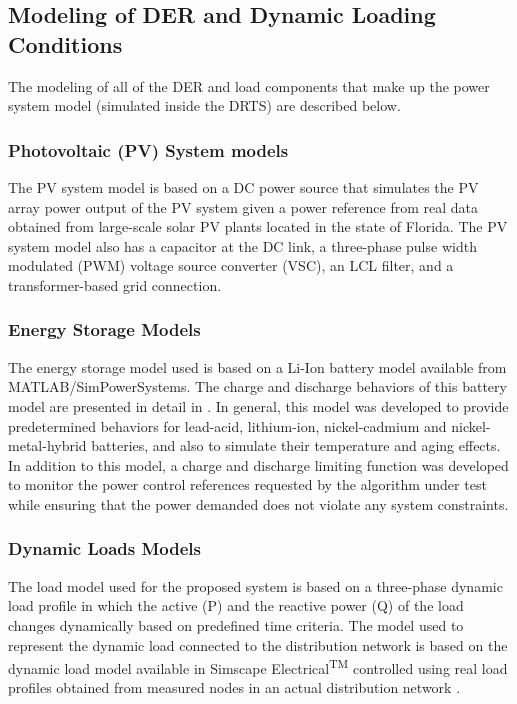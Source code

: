 \subsection{Modeling of DER and Dynamic Loading Conditions}
The modeling of all of the DER and load components that make up the power system model (simulated inside the DRTS) are described below.

\subsubsection{Photovoltaic (PV) System models}
The PV system model is based on a DC power source that simulates the PV array power output of the PV system given a power reference from real data obtained from large-scale solar PV plants located in the state of Florida. The PV system model also has a capacitor at the DC link, a three-phase pulse width modulated (PWM) voltage source converter (VSC), an LCL filter, and a transformer-based grid connection.


\subsubsection{Energy Storage Models}
The energy storage model used is based on a Li-Ion battery model available from MATLAB/SimPowerSystems. The charge and discharge behaviors of this battery model are presented in detail in  \cite{tremblay}. In general, this model was developed to provide predetermined behaviors for lead-acid, lithium-ion, nickel-cadmium and nickel-metal-hybrid batteries, and also to simulate their temperature and aging effects. In addition to this model, a charge and discharge limiting function was developed to monitor the power control references requested by the algorithm under test while ensuring that the power demanded does not violate any system constraints.


\subsubsection{Dynamic Loads Models}
The load model used for the proposed system is based on a three-phase dynamic load profile in which the active (P) and the reactive power (Q) of the load changes dynamically based on predefined time criteria. The model used to represent the dynamic load connected to the distribution network is based on the dynamic load model available in Simscape Electrical\textsuperscript{TM} controlled using real load profiles obtained from measured nodes in an actual distribution network \cite{sungrin}. 

